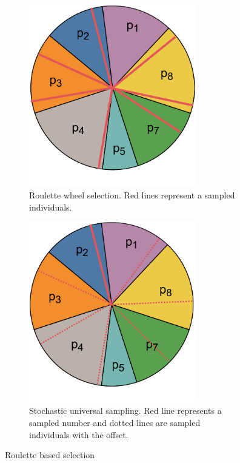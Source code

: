 \begin{figure}
    \begin{subfigure}[t]{0.47\textwidth}
        \includegraphics[width=0.8\textwidth]{img/master_roulettewheel.pdf}
        \caption{Roulette wheel selection. Red lines represent a sampled individuals.}
        \label{fig:roulettewheelselection}
    \end{subfigure}
    \hfill
    \begin{subfigure}[t]{0.47\textwidth}
        \includegraphics[width=0.8\textwidth]{img/master_stochasticuniversalsampling.pdf}
        \caption{Stochastic universal sampling. Red line represents a sampled number and dotted lines are sampled individuals with the  offset.}
        \label{fig:USB}
    \end{subfigure}
    \caption{Roulette based selection}
\end{figure}

